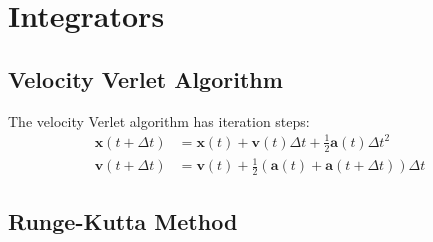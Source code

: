 \documentclass{article}
\providecommand{\xx}{\mathbf{x}}
\providecommand{\vv}{\mathbf{v}}
\renewcommand{\aa}{\mathbf{a}}
\begin{document}
\section{Integrators}
\subsection{Velocity Verlet Algorithm}

The velocity Verlet algorithm has iteration steps:
\[
  \begin{aligned}
    \xx(t+\Delta t) &= \xx(t) + \vv(t)\Delta t + \frac{1}{2}\aa(t)\Delta t^2\\
    \vv(t+\Delta t) &= \vv(t) + \frac{1}{2}(\aa(t) + \aa(t+\Delta t))\Delta t 
  \end{aligned}
\]
  
\subsection{Runge-Kutta Method}
\end{document}
